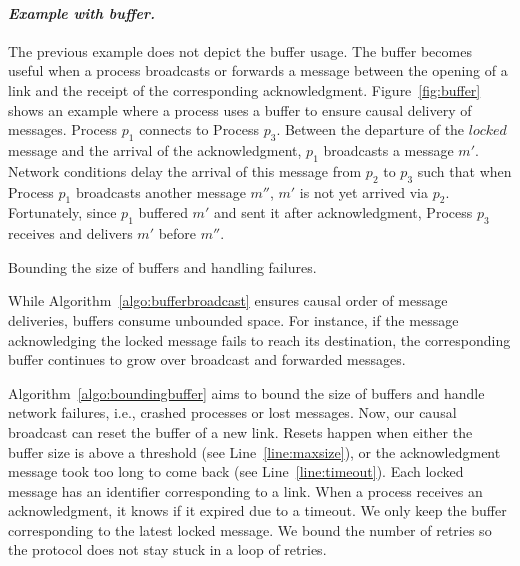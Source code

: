 \paragraph{\emph{Example with buffer.}} The previous example does not depict the
buffer usage. The buffer becomes useful when a process broadcasts or forwards a
message between the opening of a link and the receipt of the corresponding
acknowledgment. Figure~\ref{fig:buffer} shows an example where a process uses a
buffer to ensure causal delivery of messages. Process $p_1$ connects to Process
$p_3$. Between the departure of the $locked$ message and the arrival of the
acknowledgment, $p_1$ broadcasts a message $m'$. Network conditions
delay the arrival of this message from $p_2$ to $p_3$ such that when Process
$p_1$ broadcasts another message $m''$, $m'$ is not yet arrived via
$p_2$. Fortunately, since $p_1$ buffered $m'$ and sent it after acknowledgment,
Process $p_3$ receives and delivers $m'$ before $m''$.


\begin{algorithm}
  
  \caption{\label{algo:boundingbuffer}Bounding the size of buffers and handling
    failures.}
\end{algorithm}

While Algorithm~\ref{algo:bufferbroadcast} ensures causal order of message
deliveries, buffers consume unbounded space. For instance, if the message
acknowledging the locked message fails to reach its destination, the
corresponding buffer continues to grow over broadcast and forwarded messages. 

Algorithm~\ref{algo:boundingbuffer} aims to bound the size of buffers and handle
network failures, i.e., crashed processes or lost messages. Now, our causal
broadcast can reset the buffer of a new link. Resets happen when either the
buffer size is above a threshold (see Line~\ref{line:maxsize}), or the
acknowledgment message took too long to come back (see
Line~\ref{line:timeout}). Each locked message has an identifier corresponding to
a link. When a process receives an acknowledgment, it knows if it expired due to
a timeout. We only keep the buffer corresponding to the latest locked
message. We bound the number of retries so the protocol does not stay stuck in a
loop of retries.

%   


